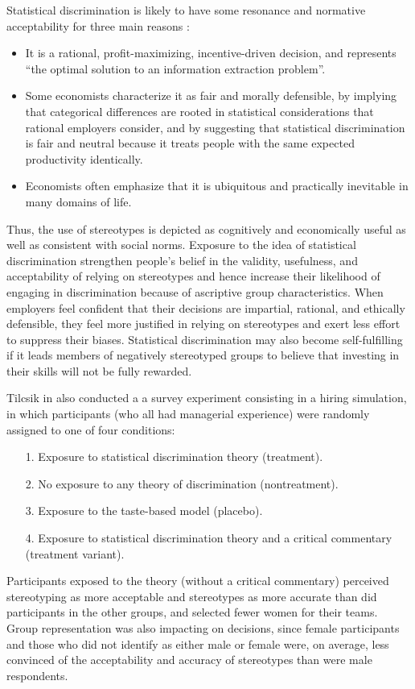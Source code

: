 Statistical discrimination is likely to have some resonance and normative acceptability for three main reasons \cite{tilcsik2020statistical}:
\begin{itemize}
\item It is a rational, profit-maximizing, incentive-driven decision, and represents ``the optimal solution to an information extraction problem''.
\item Some economists characterize it as fair and morally defensible, by implying that categorical differences are rooted in statistical considerations that rational employers consider, and by suggesting that statistical discrimination is fair and neutral because it treats people with the same expected productivity identically.
\item Economists often emphasize that it is ubiquitous and practically inevitable in many domains of life.
\end{itemize}
Thus, the use of stereotypes is depicted as cognitively and economically useful as well as consistent with social norms. Exposure to the idea of statistical discrimination strengthen people's belief in the validity, usefulness, and acceptability of relying on stereotypes and hence increase their likelihood of engaging in discrimination because of ascriptive group characteristics. When employers feel confident that their decisions are impartial, rational, and ethically defensible, they feel more justified in relying on stereotypes and exert less effort to suppress their biases. Statistical discrimination may also become self-fulfilling if it leads members of negatively stereotyped groups to believe that investing in their skills will not be fully rewarded.

Tilcsik in \cite{tilcsik2020statistical} also conducted a a survey experiment consisting in a hiring simulation, in which participants (who all had managerial experience) were randomly assigned to one of four conditions:
\begin{itemize}
\item[1.] Exposure to statistical discrimination theory (treatment).
\item[2.] No exposure to any theory of discrimination (nontreatment).
\item[3.] Exposure to the taste-based model (placebo).
\item[4.] Exposure to statistical discrimination theory and a critical commentary (treatment variant).
\end{itemize}
Participants exposed to the theory (without a critical commentary) perceived stereotyping as more acceptable and stereotypes as more accurate than did participants in the other groups, and selected fewer women for their teams. Group representation was also impacting on decisions, since female participants and those who did not identify as either male or female were, on average, less convinced of the acceptability and accuracy of stereotypes than were male respondents.

